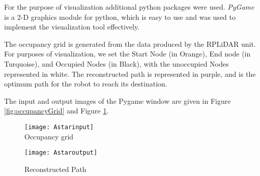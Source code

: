 For the purpose of visualization additional python packages were used. \emph{PyGame} is a 2-D graphics module for python, which is easy to use and was used to implement the visualization tool effectively. 

The occupancy grid is generated from the data produced by the RPLiDAR unit. For purposes of visualization, we set the Start Node (in Orange), End node (in Turquoise), and Occupied Nodes (in Black), with the unoccupied Nodes represented in white. The reconstructed path is represented in purple, and is the optimum path for the robot to reach its destination.

The input and output images of the Pygame window are given in Figure \ref{fig:occupancyGrid} and Figure \ref{fig:reconstructedPath}.\\

\begin{figure}[H]
    \begin{multicols}{2}
    \centering
        \texttt{[image: Astarinput]}\\
        \caption{Occupancy grid}
        \label{fig:occupancyGrid}

        \texttt{[image: Astaroutput]}\\
        \caption{Reconstructed Path}
        \label{fig:reconstructedPath}
    \end{multicols}
\end{figure}

